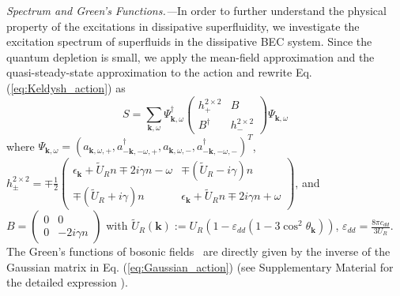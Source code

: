 \documentclass[aps,prl,twocolumn,superscriptaddress,]{revtex4-1}
\newcommand{\tmmathbf}[1]{\ensuremath{\boldsymbol{#1}}}
\begin{document}
\emph{Spectrum and Green's Functions.---}In order to further
understand the physical property of the excitations in dissipative superfluidity, we investigate the excitation spectrum of superfluids in the dissipative BEC system. %
Since the quantum depletion is small, we apply the mean-field approximation and the quasi-steady-state approximation to the action
and rewrite Eq. (\ref{eq:Keldysh_action}) as \citep{SupplementaryMaterial}
\begin{equation}
S=\sum_{\bm{k},\omega}\Psi_{\tmmathbf{k},\omega}^{\dagger}\begin{pmatrix}h_{+}^{2\times2} & B\\
B^{\dagger} & h_{-}^{2\times2}
\end{pmatrix}\Psi_{\tmmathbf{k},\omega}\label{eq:Gaussian_action}
\end{equation}
where $\Psi_{\tmmathbf{k},\omega}=(a_{\tmmathbf{k},\omega,+},a_{\tmmathbf{-k},-\omega,+}^{\dagger},a_{\tmmathbf{k},\omega,-},a_{\tmmathbf{-k},-\omega,-}^{\dagger})^{T}$,
$h_{\pm}^{2\times2}=\mp\frac{1}{2}\begin{pmatrix}\epsilon_{\tmmathbf{k}}+\tilde{U}_Rn\mp2i\gamma n-\omega & \mp(\tilde{U}_R-i\gamma)n\\
\mp(\tilde{U}_R+i\gamma)n & \epsilon_{\tmmathbf{k}}+\tilde{U}_Rn\mp2i\gamma n+\omega
\end{pmatrix}$, and $B=\begin{pmatrix}0 & 0\\
0 & -2i\gamma n
\end{pmatrix}$
with $\tilde{U}_R(\bm{k}):=U_R(1-\varepsilon_{dd}(1-3\cos^2\theta_{\bm{k}}))$, $\varepsilon_{dd}=\frac{8\pi c_{dd}}{3U_R}$. The
Green's functions of bosonic fields~\cite{Kamenev_2011} are directly given by the inverse
of the Gaussian matrix in Eq. (\ref{eq:Gaussian_action}) (see Supplementary Material for the detailed expression \citep{SupplementaryMaterial}). 
\end{document}
